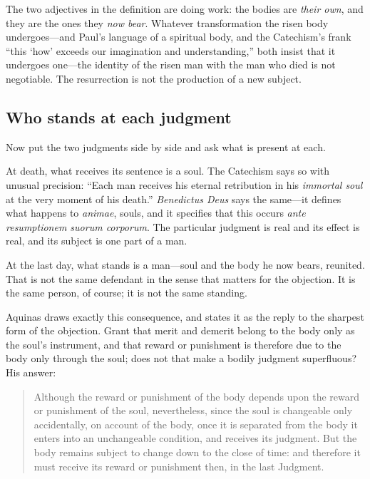 The two adjectives in the definition are doing work: the bodies are \emph{their own}, and they are the ones they \emph{now bear}. Whatever transformation the risen body undergoes---and Paul's language of a spiritual body, and the Catechism's frank ``this `how' exceeds our imagination and understanding,'' both insist that it undergoes one---the identity of the risen man with the man who died is not negotiable. The resurrection is not the production of a new subject.

\subsection{Who stands at each judgment}

Now put the two judgments side by side and ask what is present at each.

At death, what receives its sentence is a soul. The Catechism says so with unusual precision: ``Each man receives his eternal retribution in his \emph{immortal soul} at the very moment of his death.'' \emph{Benedictus Deus} says the same---it defines what happens to \emph{animae}, souls, and it specifies that this occurs \emph{ante resumptionem suorum corporum}. The particular judgment is real and its effect is real, and its subject is one part of a man.

At the last day, what stands is a man---soul and the body he now bears, reunited. That is not the same defendant in the sense that matters for the objection. It is the same person, of course; it is not the same standing.

Aquinas draws exactly this consequence, and states it as the reply to the sharpest form of the objection. Grant that merit and demerit belong to the body only as the soul's instrument, and that reward or punishment is therefore due to the body only through the soul; does not that make a bodily judgment superfluous? His answer:

\begin{quote}
Although the reward or punishment of the body depends upon the reward or punishment of the soul, nevertheless, since the soul is changeable only accidentally, on account of the body, once it is separated from the body it enters into an unchangeable condition, and receives its judgment. But the body remains subject to change down to the close of time: and therefore it must receive its reward or punishment then, in the last Judgment.
\end{quote}

